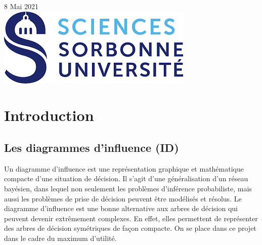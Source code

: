 \documentclass[12pt]{article}
\begin{document}
\begin{titlepage}


{\large 8 Mai 2021}\\[2cm] %


\includegraphics[scale=0.5]{logo.png}\\[1cm] %
 

\vfill %

\end{titlepage}

\renewcommand{\contentsname}{Table des Matières}
\pagebreak
\tableofcontents
\pagebreak

\section{Introduction}

\subsection{Les diagrammes d'influence (ID)}
Un diagramme d'influence est une représentation graphique et mathématique compacte d'une situation de décision. Il s'agit d'une généralisation d'un réseau bayésien, dans lequel non seulement les problèmes d'inférence probabiliste, mais aussi les problèmes de prise de décision peuvent être modélisés et résolus. 
Le diagramme d'influence est une bonne alternative aux arbres de décision qui peuvent devenir extrêmement complexes. En effet, elles permettent de représenter des arbres de décision symétriques de façon compacte. On se place dans ce projet dans le cadre du maximum d'utilité.
\end{document}

